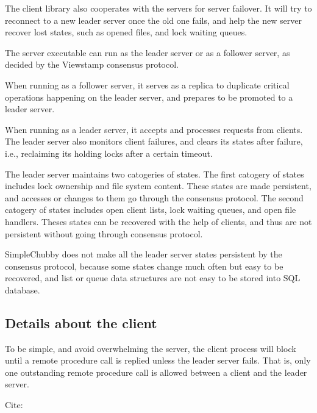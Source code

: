 The client library also cooperates with the servers for server failover.  
It will try to reconnect to a new leader server once the old one fails,
and help the new server recover lost states,
such as opened files, and lock waiting queues.

The server executable can run as the leader server or as a follower server,
as decided by the Viewstamp consensus protocol.

When running as a follower server, it serves as a replica to duplicate critical
operations happening on the leader server, and prepares to be promoted to a leader
server.

When running as a leader server, it accepts and processes requests from clients.
The leader server also monitors client failures, and clears its states after failure,
i.e., reclaiming its holding locks after a certain timeout.

The leader server maintains two catogeries of states.
The first catogery of states includes lock ownership and file system content. These
states are made persistent, and accesses or changes to them go through the consensus
protocol.
The second catogery of states includes open client lists, lock waiting queues,
and open file handlers.
Theses states can be recovered with the help of clients,
and thus are not persistent without going through consensus protocol.

SimpleChubby does not make all the leader server states persistent by the consensus
protocol, because some states change much often but easy to be recovered,
and list or queue data structures are not easy to be stored into SQL database.
 
\subsection{Details about the client}
To be simple, and avoid overwhelming the server, the client process will block until a remote procedure call is
replied unless the leader server fails. That is, only one outstanding remote procedure call is allowed between
a client and the leader server.

Cite: \cite{nothing}
